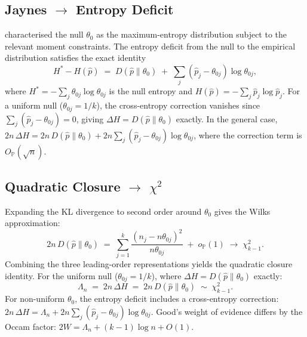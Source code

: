 \documentclass[11pt]{article}
\newcommand{\1}{\mathbf{1}}
\newcommand{\PP}{\mathbb{P}}
\theoremstyle{plain}
\theoremstyle{definition}
\theoremstyle{remark}
\begin{document}
\subsection{\texorpdfstring{Jaynes $\to$ Entropy Deficit}{Jaynes to Entropy Deficit}}\label{app:tri-jaynes}

\citet{Jaynes1957} characterised the null $\theta_0$ as the maximum-entropy distribution subject to the relevant moment constraints.
The entropy deficit from the null to the empirical distribution satisfies the exact identity
\begin{equation}\label{eq:tri-entropy}
H^{*}-H(\hat{p}) \;=\; D(\hat{p}\|\theta_0) \;+\; \sum_{j}(\hat{p}_j - \theta_{0j})\log\theta_{0j},
\end{equation}
where $H^{*}=-\sum_j\theta_{0j}\log\theta_{0j}$ is the null entropy and $H(\hat{p})=-\sum_j\hat{p}_j\log\hat{p}_j$.
For a uniform null ($\theta_{0j}=1/k$), the cross-entropy correction vanishes since $\sum_j(\hat{p}_j-\theta_{0j})=0$, giving $\Delta H = D(\hat{p}\|\theta_0)$ exactly.
In the general case, $2n\,\Delta H = 2n\,D(\hat{p}\|\theta_0) + 2n\sum_j(\hat{p}_j-\theta_{0j})\log\theta_{0j}$, where the correction term is $O_{\PP}(\sqrt{n})$.


\subsection{\texorpdfstring{Quadratic Closure $\to$ $\chi^2$}{Quadratic Closure to chi-squared}}\label{app:tri-chi2}

Expanding the KL divergence to second order around $\theta_0$ gives the Wilks approximation:
\begin{equation}\label{eq:tri-wilks}
2n\,D(\hat{p}\|\theta_0) \;=\; \sum_{j=1}^{k} \frac{(n_j - n\theta_{0j})^{2}}{n\theta_{0j}} \;+\; o_{\PP}(1) \;\to\; \chi^{2}_{k-1}.
\end{equation}
Combining the three leading-order representations yields the quadratic closure identity.
For the uniform null ($\theta_{0j}=1/k$), where $\Delta H = D(\hat{p}\|\theta_0)$ exactly:
\begin{equation}\label{eq:tri-identity}
\boxed{\;\Lambda_n \;=\; 2n\,\Delta H \;=\; 2n\,D(\hat{p}\|\theta_0) \;\sim\; \chi^{2}_{k-1}.\;}
\end{equation}
For non-uniform $\theta_0$, the entropy deficit includes a cross-entropy correction: $2n\,\Delta H = \Lambda_n + 2n\sum_j(\hat{p}_j-\theta_{0j})\log\theta_{0j}$.
Good's weight of evidence differs by the Occam factor: $2W = \Lambda_n + (k{-}1)\log n + O(1)$.
\end{document}
